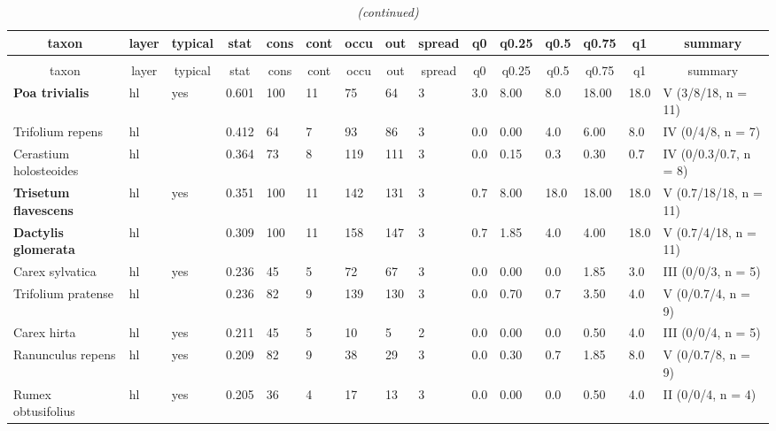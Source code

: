 \documentclass[9pt]{article}
\begin{document}
\newpage
\setlongtables\begin{longtable}{lllllllllllllll}\caption{Partion summary for cluster 3 consisting out of 11 plots.} \tabularnewline
\toprule
\multicolumn{1}{c}{taxon}&\multicolumn{1}{c}{layer}&\multicolumn{1}{c}{typical}&\multicolumn{1}{c}{stat}&\multicolumn{1}{c}{cons}&\multicolumn{1}{c}{cont}&\multicolumn{1}{c}{occu}&\multicolumn{1}{c}{out}&\multicolumn{1}{c}{spread}&\multicolumn{1}{c}{q0}&\multicolumn{1}{c}{q0.25}&\multicolumn{1}{c}{q0.5}&\multicolumn{1}{c}{q0.75}&\multicolumn{1}{c}{q1}&\multicolumn{1}{c}{summary}\tabularnewline
\midrule
\endfirsthead\caption[]{\em (continued)} \tabularnewline
\midrule
\multicolumn{1}{c}{taxon}&\multicolumn{1}{c}{layer}&\multicolumn{1}{c}{typical}&\multicolumn{1}{c}{stat}&\multicolumn{1}{c}{cons}&\multicolumn{1}{c}{cont}&\multicolumn{1}{c}{occu}&\multicolumn{1}{c}{out}&\multicolumn{1}{c}{spread}&\multicolumn{1}{c}{q0}&\multicolumn{1}{c}{q0.25}&\multicolumn{1}{c}{q0.5}&\multicolumn{1}{c}{q0.75}&\multicolumn{1}{c}{q1}&\multicolumn{1}{c}{summary}\tabularnewline
\midrule
\endhead
\midrule
\endfoot
\label{as.matrix}
\textbf{ Poa trivialis }&hl&yes&0.601&100&11& 75& 64&3&3.0&8.00& 8.0&18.00&18.0&V (3/8/18, n = 11)\tabularnewline
Trifolium repens&hl&&0.412& 64& 7& 93& 86&3&0.0&0.00& 4.0& 6.00& 8.0&IV (0/4/8, n = 7)\tabularnewline
Cerastium holosteoides&hl&&0.364& 73& 8&119&111&3&0.0&0.15& 0.3& 0.30& 0.7&IV (0/0.3/0.7, n = 8)\tabularnewline
\textbf{ Trisetum flavescens }&hl&yes&0.351&100&11&142&131&3&0.7&8.00&18.0&18.00&18.0&V (0.7/18/18, n = 11)\tabularnewline
\textbf{ Dactylis glomerata }&hl&&0.309&100&11&158&147&3&0.7&1.85& 4.0& 4.00&18.0&V (0.7/4/18, n = 11)\tabularnewline
Carex sylvatica&hl&yes&0.236& 45& 5& 72& 67&3&0.0&0.00& 0.0& 1.85& 3.0&III (0/0/3, n = 5)\tabularnewline
Trifolium pratense&hl&&0.236& 82& 9&139&130&3&0.0&0.70& 0.7& 3.50& 4.0&V (0/0.7/4, n = 9)\tabularnewline
Carex hirta&hl&yes&0.211& 45& 5& 10&  5&2&0.0&0.00& 0.0& 0.50& 4.0&III (0/0/4, n = 5)\tabularnewline
Ranunculus repens&hl&yes&0.209& 82& 9& 38& 29&3&0.0&0.30& 0.7& 1.85& 8.0&V (0/0.7/8, n = 9)\tabularnewline
Rumex obtusifolius&hl&yes&0.205& 36& 4& 17& 13&3&0.0&0.00& 0.0& 0.50& 4.0&II (0/0/4, n = 4)\tabularnewline

\end{longtable}
\end{document}
